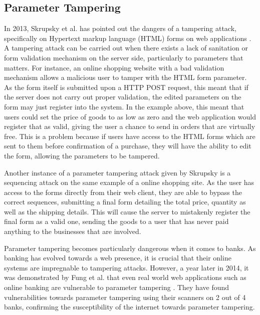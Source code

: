 \documentclass[runningheads]{llncs}
\begin{document}
\subsection{Parameter Tampering}
In 2013, Skrupsky et al. has pointed out the dangers of a tampering attack, specifically on Hypertext markup language (HTML) forms on web applications \cite{bisht_hinrichs_skrupsky_venkatakrishnan_2014}. A tampering attack can be carried out when there exists a lack of sanitation or form validation mechanism on the server side, particularly to parameters that matters. For instance, an online shopping website with a bad validation mechanism allows a malicious user to tamper with the HTML form parameter. As the form itself is submitted upon a HTTP POST request, this meant that if the server does not carry out proper validation, the edited parameters on the form may just register into the system. In the example above, this meant that users could set the price of goods to as low as zero and the web application would register that as valid, giving the user a chance to send in orders that are virtually free. This is a problem because if users have access to the HTML forms which are sent to them before confirmation of a purchase, they will have the ability to edit the form, allowing the parameters to be tampered. 

Another instance of a parameter tampering attack given by Skrupsky is a sequencing attack on the same example of a online shopping site. As the user has access to the forms directly from their web client, they are able to bypass the correct sequences, submitting a final form detailing the total price, quantity as well as the shipping details. This will cause the server to mistakenly register the final form as a valid one, sending the goods to a user that has never paid anything to the businesses that are involved.

Parameter tampering becomes particularly dangerous when it comes to banks. As banking has evolved towards a web presence, it is crucial that their online systems are impregnable to tampering attacks. However, a year later in 2014, it was demonstrated by Fung et al. that even real world web applications such as online banking are vulnerable to parameter tampering \cite{fung_wang_cheung_wong_2014}. They have found vulnerabilities towards parameter tampering using their scanners on 2 out of 4 banks, confirming the susceptibility of the internet towards parameter tampering. 
\end{document}
